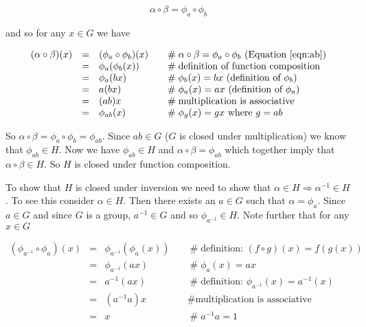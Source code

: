 \documentclass[11pt, oneside]{article}   	%
\theoremstyle{definition}
\begin{document}
\begin{equation}
\alpha \circ \beta = \phi_a \circ \phi_b
\label{eqn:ab}
\end{equation}
 
\bigskip
\noindent
and so for any $x \in G$ we have

\bigskip
\begin{equation}
\begin{array}{rcll}
(\alpha \circ \beta)(x)  
&=& (\phi_a \circ \phi_b)(x)                &\quad  \mathrel{\#}  \alpha \circ \beta = \phi_a \circ \phi_b \text{ (Equation \ref{eqn:ab})} \\
&=& \phi_{a}(\phi_{b}(x))                    &\quad  \mathrel{\#} \text{definition of function composition}          \\
&=& \phi_{a}(bx)                                 &\quad  \mathrel{\#} \phi_b(x) = bx \text{ (definition of $\phi_b$)}  \\
&=& a(bx)                                           &\quad  \mathrel{\#} \phi_a(x) = ax \text{ (definition of $\phi_a$)}  \\
&=& (ab)x                                           &\quad  \mathrel{\#} \text{multiplication is associative}                 \\
&=& \phi_{ab}(x)                                 &\quad  \mathrel{\#} \phi_{g}(x) =gx  \text{ where $g=ab$}
\end{array}
\label{eqn:function_composition}
\end{equation}

\bigskip
\noindent
So $\alpha \circ \beta = \phi_a \circ \phi_b = \phi_{ab}$. Since $ab \in G$ ($G$ is closed under multiplication) we know that $\phi_{ab} \in H$. Now
we have $\phi_{ab} \in H$ and $\alpha \circ \beta = \phi_{ab}$ which together imply that  $\alpha \circ \beta \in H$. So $H$ is closed under function composition.

\bigskip
\noindent
To show that $H$ is closed under inversion we need to show that $\alpha \in H \Rightarrow \alpha^{-1} \in H$.
To see this consider $\alpha \in H$.  Then there exists an $a \in G$ such that $\alpha = \phi_a$. 
Since $a \in G$ and since $G$ is a group, $a^{-1} \in G$ and so $\phi_{a^{-1}} \in H$. Note further that for any $x \in G$

\bigskip
\begin{equation}
\begin{array}{rcll}
(\phi_{a^{-1}} \circ \phi_a)(x)
&=& \phi_{a^{-1}}(\phi_a(x))        &\quad  \mathrel{\#} \text{definition: $(f \circ g)(x) = f(g(x))$}        \\
&=& \phi_{a^{-1}}(ax)                   &\quad  \mathrel{\#} \phi_a(x) = ax                                                \\
&=& a^{-1}(ax)                             &\quad  \mathrel{\#} \text{definition: } \phi_{a^{-1}}(x) = a^{-1}(x)  \\
&=& (a^{-1}a)x                             &\quad  \mathrel{\#} \text{multiplication is associative}                  \\
&=& x                                           &\quad  \mathrel{\#} a^{-1}a = 1
\end{array}
\label{eqn:comp1}
\end{equation}
\end{document}
